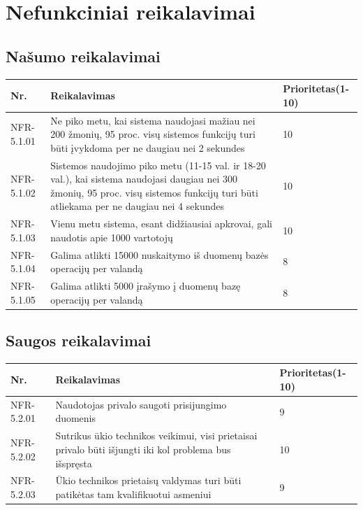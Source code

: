 \documentclass[oneside]{VUMIFPSkursinis}
\begin{document}
\section{Nefunkciniai reikalavimai}
\subsection{Našumo reikalavimai}
\begin{table}[htbp]
	\begin{tabularx}{1\textwidth}{ |P{2.5cm}|X|P{3cm }| }  \hline
		Nr. & Reikalavimas & Prioritetas(1-10) \\ \hline
		NFR-5.1.01 & Ne piko metu, kai sistema naudojasi mažiau nei 200 žmonių, 95 proc. visų sistemos funkcijų turi būti įvykdoma per ne daugiau nei 2 sekundes & 10 \\ \hline
		NFR-5.1.02 & Sistemos naudojimo piko metu (11-15 val. ir 18-20 val.), kai sistema naudojasi daugiau nei 300 žmonių, 95 proc. visų sistemos funkcijų turi būti atliekama per ne daugiau nei 4 sekundes & 10 \\ \hline
		NFR-5.1.03 & Vienu metu sistema, esant didžiausiai apkrovai, gali naudotis apie 1000 vartotojų & 10 \\ \hline
		NFR-5.1.04 & Galima atlikti 15000 nuskaitymo iš duomenų bazės operacijų per valandą & 8 \\ \hline
		NFR-5.1.05 & Galima atlikti 5000 įrašymo į duomenų bazę operacijų per valandą  & 8 \\ \hline
	\end{tabularx}
\end{table}
\subsection{Saugos reikalavimai}
\begin{table}[htbp]
	\begin{tabularx}{1\textwidth}{ |P{2.5cm}|X|P{3cm }| }  \hline
		Nr. & Reikalavimas & Prioritetas(1-10) \\ \hline
		NFR-5.2.01 & Naudotojas privalo saugoti prisijungimo duomenis & 9 \\ \hline
		NFR-5.2.02 & Sutrikus ūkio technikos veikimui, visi prietaisai privalo būti išjungti iki kol problema bus išspręsta & 10 \\ \hline
		NFR-5.2.03 & Ūkio technikos prietaisų valdymas turi būti patikėtas tam kvalifikuotui asmeniui & 9 \\ \hline
	\end{tabularx}
\end{table}
\end{document}
